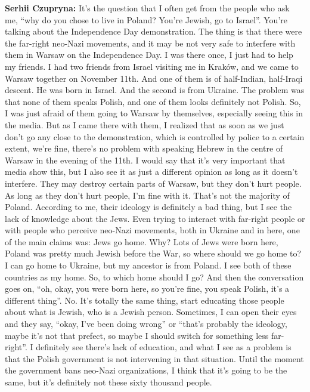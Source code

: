 \textbf{Serhii Czupryna:} It’s the question that I often get from the people who ask me, “why do you chose to live in Poland? You’re Jewish, go to Israel”. You’re talking about the Independence Day demonstration. The thing is that there were the far-right neo-Nazi movements, and it may be not very safe to interfere with them in Warsaw on the Independence Day. I was there once, I just had to help my friends. I had two friends from Israel visiting me in Kraków, and we came to Warsaw together on  November 11th. And one of them is of half-Indian, half-Iraqi descent. He was born in Israel. And the second is from Ukraine. The problem was that none of them speaks Polish, and one of them looks definitely not Polish. So, I was just afraid of them going to Warsaw by themselves, especially seeing this in the media. But as I came there with them, I realized that as soon as we just don’t go any close to the demonstration, which is controlled by police to a certain extent, we’re fine, there’s no problem with speaking Hebrew in the centre of Warsaw in the evening of the 11th. I would say that it’s very important that media show this, but I also see it as just a different opinion as long as it doesn’t interfere. They may destroy certain parts of Warsaw, but they don’t hurt people. As long as they don’t hurt people, I’m fine with it. That’s not the majority of Poland. According to me, their ideology is definitely a bad thing, but I see the lack of knowledge about the Jews. Even trying to interact with far-right people or with people who perceive neo-Nazi movements, both in Ukraine and in here, one of the main claims was: Jews go home. Why? Lots of Jews were born here, Poland was pretty much Jewish before the War, so where should we go home to? I can go home to Ukraine, but my ancestor is from Poland. I see both of these countries as my home. So, to which home should I go? And then the conversation goes on, “oh, okay, you were born here, so you’re fine, you speak Polish, it’s a different thing”. No. It’s totally the same thing, start educating those people about what is Jewish, who is a Jewish person. Sometimes, I can open their eyes and they say, “okay, I’ve been doing wrong” or “that’s probably the ideology, maybe it’s not that prefect, so maybe I should switch for something less far-right''. I definitely see there’s lack of education, and what I see as a problem is that the Polish government is not intervening in that situation. Until the moment the government bans neo-Nazi organizations, I think that it’s going to be the same, but it’s definitely not these sixty thousand people.\par
